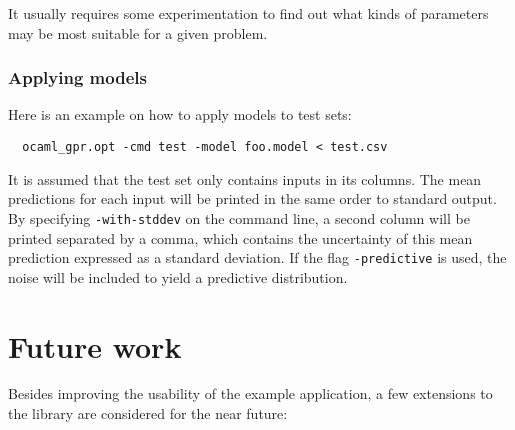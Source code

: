 \documentclass[10pt]{report}
\begin{document}
It usually requires some experimentation to find out what kinds of parameters
may be most suitable for a given problem.

\subsection{Applying models}

Here is an example on how to apply models to test sets:

\begin{verbatim}
  ocaml_gpr.opt -cmd test -model foo.model < test.csv
\end{verbatim}

It is assumed that the test set only contains inputs in its columns.  The mean
predictions for each input will be printed in the same order to standard
output.\\

By specifying \verb=-with-stddev= on the command line, a second column will be
printed separated by a comma, which contains the uncertainty of this mean
prediction expressed as a standard deviation.  If the flag \verb=-predictive= is
used, the noise will be included to yield a predictive distribution.

\chapter{Future work}

Besides improving the usability of the example application, a few extensions to
the library are considered for the near future:
\end{document}
